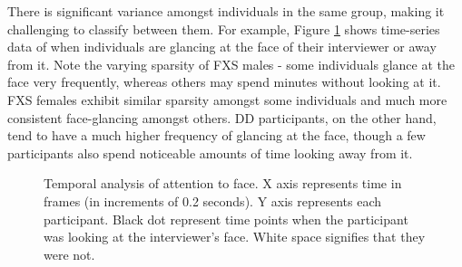 \documentclass[10pt,twocolumn,letterpaper]{article}
\begin{document}
There is significant variance amongst individuals in the same group, making it challenging to classify between them. For example, Figure \ref{fig:sticky} shows time-series data of when individuals are glancing at the face of their interviewer or away from it. Note the varying sparsity of FXS males - some individuals glance at the face very frequently, whereas others may spend minutes without looking at it. FXS females exhibit similar sparsity amongst some individuals and much more consistent face-glancing amongst others. DD participants, on the other hand, tend to have a much higher frequency of glancing at the face, though a few participants also spend noticeable amounts of time looking away from it. 

\begin{figure}
       
            \hfill
            \hfill
            \centering
        
         \caption{Temporal analysis of attention to face. X axis represents time in frames (in increments of 0.2 seconds). Y axis represents each participant. Black dot represent time points when the participant was looking at the interviewer's face. White space signifies that they were not.}
          \label{fig:sticky}
\end{figure}
\end{document}
